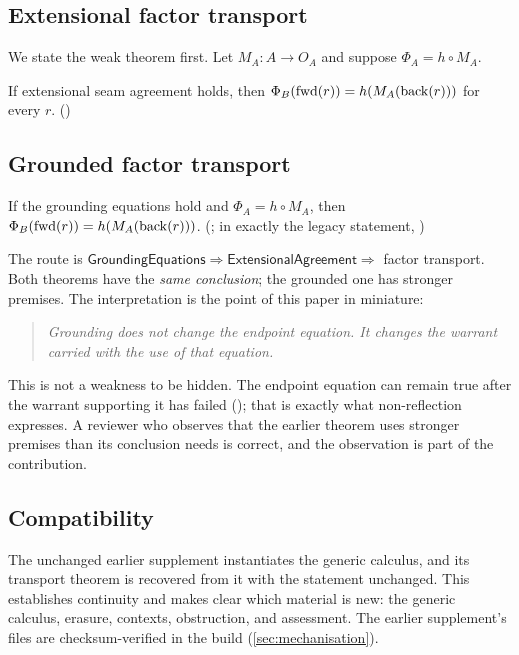 \subsection{Extensional factor transport}
We state the weak theorem first. Let $M_A : A \to O_A$ and suppose $\Phi_A = h \circ M_A$.
\begin{theorem}\label{thm:extfactor}
If extensional seam agreement holds, then $\Phi_B(\mathrm{fwd}(r)) = h(M_A(\mathrm{back}(r)))$ for every $r$. ()
\end{theorem}

\subsection{Grounded factor transport}
\begin{corollary}\label{cor:groundedfactor}
If the grounding equations hold and $\Phi_A = h \circ M_A$, then $\Phi_B(\mathrm{fwd}(r)) = h(M_A(\mathrm{back}(r)))$. (; in exactly the legacy statement, )
\end{corollary}
The route is $\mathsf{GroundingEquations} \Rightarrow \mathsf{ExtensionalAgreement} \Rightarrow$ factor transport. Both theorems have the \emph{same conclusion}; the grounded one has stronger premises. The interpretation is the point of this paper in miniature:
\begin{quote}
\emph{Grounding does not change the endpoint equation. It changes the warrant carried with the use of that equation.}
\end{quote}
This is not a weakness to be hidden. The endpoint equation can remain true after the warrant supporting it has failed (); that is exactly what non-reflection expresses. A reviewer who observes that the earlier theorem uses stronger premises than its conclusion needs is correct, and the observation is part of the contribution.

\subsection{Compatibility}
The unchanged earlier supplement instantiates the generic calculus, and its transport theorem is recovered from it with the statement unchanged. This establishes continuity and makes clear which material is new: the generic calculus, erasure, contexts, obstruction, and assessment. The earlier supplement's files are checksum-verified in the build (\cref{sec:mechanisation}).
